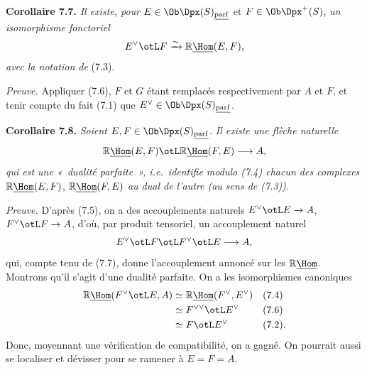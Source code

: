 \textbf{Corollaire 7.7.} \emph{Il existe, pour} \(E\in\Ob\Dpx(S)_{\underline{\mathrm{parf}}}\) et \(F\in\Ob\Dpx^+(S)\), \emph{un isomorphisme fonctoriel}
\[
  E^\vee\otL F\xrightarrow{\sim}\mathbb{R}\underline{\Hom}(E,F),
\]
\emph{avec la notation de} (7.3).

\emph{Preuve.} Appliquer (7.6), \(F\) et \(G\) étant remplacés respectivement par \(A\) et \(F\), et tenir compte du fait (7.1) que \(E^\vee\in\Ob\Dpx(S)_{\underline{\mathrm{parf}}}\).

\textbf{Corollaire 7.8.} \emph{Soient} \(E,F\in\Ob\Dpx(S)_{\underline{\mathrm{parf}}}\). \emph{Il existe une flèche naturelle}
\[
  \mathbb{R}\underline{\Hom}(E,F)\otL\mathbb{R}\underline{\Hom}(F,E)\longrightarrow A,
\]
\emph{qui est une «~dualité parfaite~», i.e.\ identifie modulo (7.4) chacun des complexes} \(\mathbb{R}\underline{\Hom}(E,F)\), \(\mathbb{R}\underline{\Hom}(F,E)\) \emph{au dual de l'autre (au sens de (7.3))}.

\emph{Preuve.} D'après (7.5), on a des accouplements naturels \(E^\vee\otL E\to A\), \(F^\vee\otL F\to A\), d'où, par produit tensoriel, un accouplement naturel
\[
  E^\vee\otL F\otL F^\vee\otL E\longrightarrow A,
\]
qui, compte tenu de (7.7), donne l'accouplement annoncé sur les \(\mathbb{R}\underline{\Hom}\). Montrons qu'il s'agit d'une dualité parfaite. On a les isomorphismes canoniques
\[
\begin{aligned}
\mathbb{R}\underline{\Hom}(F^\vee\otL E,A)&\simeq\mathbb{R}\underline{\Hom}(F^\vee,E^\vee) &&(7.4)\\
&\simeq F^{\vee\vee}\otL E^\vee &&(7.6)\\
&\simeq F\otL E^\vee &&(7.2).
\end{aligned}
\]
Donc, moyennant une vérification de compatibilité, on a gagné. On pourrait aussi se localiser et dévisser pour se ramener à \(E=F=A\).


